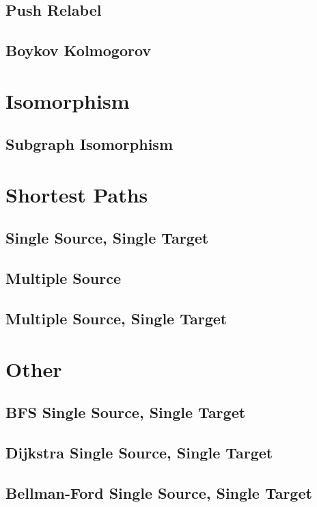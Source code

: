 \subsection{Push Relabel}
\subsection{Boykov Kolmogorov}

\section{Isomorphism}
\subsection{Subgraph Isomorphism}


\section{Shortest Paths}
\subsection{Single Source, Single Target}
\subsection{Multiple Source}
\subsection{Multiple Source, Single Target}


\section{Other}
\subsection{BFS Single Source, Single Target}
\subsection{Dijkstra Single Source, Single Target}
\subsection{Bellman-Ford Single Source, Single Target}

